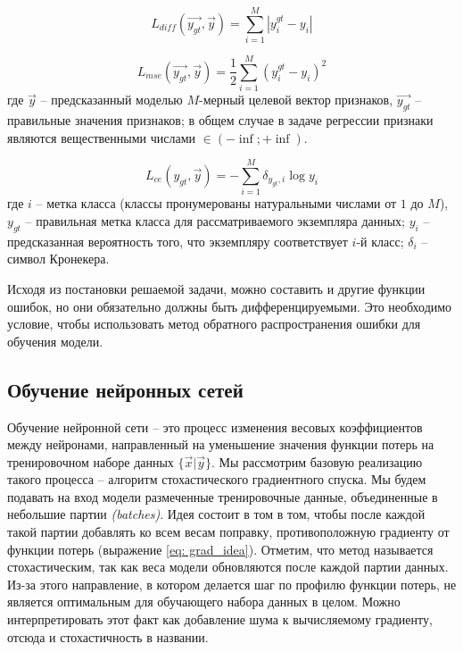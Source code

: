 \begin{equation}\label{eq:diff}
    L_{diff}(\vec{y_{gt}}, \vec{y}) = \sum_{i=1}^M | y^{gt}_{i} - y_{i} |
\end{equation}

\begin{equation}\label{eq: se}
    L_{mse}(\vec{y_{gt}}, \vec{y}) = \frac{1}{2} \sum_{i=1}^M (y^{gt}_{i} - y_{i})^2
\end{equation}
где $\vec{y}$ -- предсказанный моделью $M$-мерный целевой вектор 
признаков, $\vec{y_{gt}}$ -- правильные значения признаков; в общем
случае в задаче регрессии признаки являются вещественными числами
 $\in (- \inf; + \inf )$.

\begin{equation}\label{eq: cross_entropy}
    L_{ce}(y_{gt}, \vec{y}) = - \sum_{i=1}^M \delta_{y_{gt}, i} \log{y_{i}}
\end{equation}
где $i$ -- метка класса (классы пронумерованы натуральными 
числами от $1$ до $M$),
$y_{gt}$ --  правильная метка класса
для рассматриваемого экземпляра данных;
$y_i$ -- предсказанная вероятность того, что 
экземпляру соответствует $i$-й класс;
$\delta_i$ -- символ Кронекера. 


\indent
\indent
Исходя из постановки решаемой задачи, можно составить и другие функции ошибок, но
они обязательно должны быть дифференцируемыми.
Это необходимо условие, чтобы использовать метод обратного распространения
ошибки для обучения модели.


\subsection{Обучение нейронных сетей}

\indent
\indent
Обучение нейронной сети -- это процесс изменения весовых
коэффициентов между нейронами, направленный на уменьшение
 значения функции потерь на тренировочном наборе данных $\{ \vec{x} | \vec{y} \}$. 
 Мы рассмотрим базовую реализацию такого процесса -- алгоритм 
 стохастического градиентного спуска. Мы будем подавать на вход модели
 размеченные тренировочные данные, объединенные в  небольшие партии 
 \textit{(batches)}. Идея состоит в том в том, чтобы после каждой такой партии
добавлять ко всем весам поправку, противоположную градиенту от функции потерь
(выражение \ref{eq: grad_idea}). 
Отметим, что метод называется стохастическим, так как веса 
модели обновляются после каждой партии данных. Из-за этого
направление, в котором делается шаг по профилю функции потерь,
не является оптимальным для обучающего набора данных в целом.
Можно интерпретировать этот факт как добавление шума
к вычисляемому градиенту, отсюда и стохастичность в названии.


